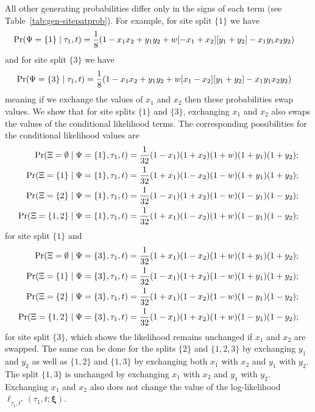 All other generating probabilities differ only in the signs of each term (see Table~\ref{tab:gen-sitepatprob}).
For example, for site split $\{1\}$ we have
\begin{align*}
    \Pr(\Psi=\{1\}\mid \tau_1, t) & = \frac{1}{8} (1 - x_1x_2 +  y_1y_2 +  w[-x_1 + x_2][y_1 + y_2] - x_1y_1x_2y_2)
\end{align*}
and for site split $\{3\}$ we have
\begin{align*}
    \Pr(\Psi=\{3\}\mid \tau_1, t) & = \frac{1}{8} (1 - x_1x_2 +  y_1y_2 +  w[x_1 - x_2][y_1 + y_2] - x_1y_1x_2y_2)
\end{align*}
meaning if we exchange the values of $x_1$ and $x_2$ then these probabilities swap values.
We show that for site splits $\{1\}$ and $\{3\}$, exchanging $x_1$ and $x_2$ also swaps the values of the conditional likelihood terms.
The corresponding possibilities for the conditional likelihood values are
\begin{align*}
    \Pr(\Xi=\emptyset \mid \Psi=\{1\}, \tau_1, t) &= \frac{1}{32}(1-x_1)(1+x_2)(1+w)(1+y_1)(1+y_2); \\
    \Pr(\Xi=\{1\} \mid \Psi=\{1\}, \tau_1, t) &= \frac{1}{32}(1+x_1)(1-x_2)(1-w)(1+y_1)(1+y_2); \\
    \Pr(\Xi=\{2\} \mid \Psi=\{1\}, \tau_1, t) &= \frac{1}{32}(1-x_1)(1+x_2)(1-w)(1-y_1)(1-y_2); \\
    \Pr(\Xi=\{1,2\} \mid \Psi=\{1\}, \tau_1, t) &= \frac{1}{32}(1+x_1)(1-x_2)(1+w)(1-y_1)(1-y_2);
\end{align*}
for site split $\{1\}$ and
\begin{align*}
        \Pr(\Xi=\emptyset \mid \Psi=\{3\}, \tau_1, t) &= \frac{1}{32}(1+x_1)(1-x_2)(1+w)(1+y_1)(1+y_2); \\
    \Pr(\Xi=\{1\} \mid \Psi=\{3\}, \tau_1, t) &= \frac{1}{32}(1-x_1)(1+x_2)(1-w)(1+y_1)(1+y_2); \\
    \Pr(\Xi=\{2\} \mid \Psi=\{3\}, \tau_1, t) &= \frac{1}{32}(1+x_1)(1-x_2)(1-w)(1-y_1)(1-y_2); \\
    \Pr(\Xi=\{1,2\} \mid \Psi=\{3\}, \tau_1, t) &= \frac{1}{32}(1-x_1)(1+x_2)(1+w)(1-y_1)(1-y_2);
\end{align*}
for site split $\{3\}$, which shows the likelihood remains unchanged if $x_1$ and $x_2$ are swapped.
The same can be done for the splits $\{2\}$ and $\{1,2,3\}$ by exchanging $y_1$ and $y_2$ as well as $\{1,2\}$ and $\{1,3\}$ by exchanging both $x_1$ with $x_2$ and $y_1$ with $y_2$.
The split $\{1,3\}$ is unchanged by exchanging $x_1$ with $x_2$ and $y_1$ with $y_2$.
Exchanging $x_1$ and $x_2$ also does not change the value of the log-likelihood $\ell_{\tau_1,t^*}(\tau_1, t; \boldsymbol\xi)$.

